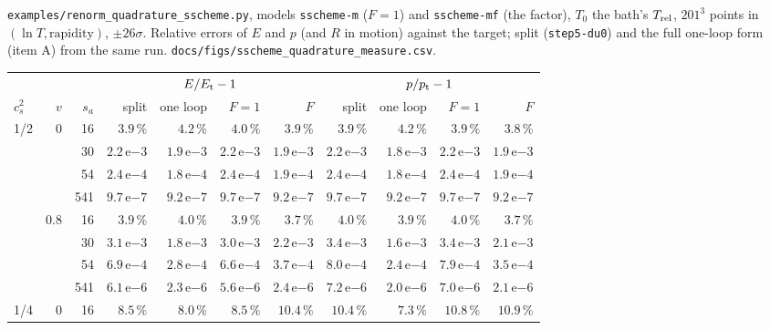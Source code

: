 \documentclass[11pt,aps,preprint,nofootinbib,superscriptaddress,tightenlines]{revtex4-2}
\begin{document}
\nolinkurl{examples/renorm_quadrature_sscheme.py}, models \texttt{sscheme-m} ($F=1$) and \texttt{sscheme-mf} (the factor), $T_0$ the bath's $T_{\rm rel}$,
$201^3$ points in $(\ln T,\text{rapidity})$, $\pm26\sigma$.  Relative errors of $E$ and $p$ (and $R$ in motion) against the target; split
(\texttt{step5-du0}) and the full one-loop form (item A) from the same run.  \texttt{docs/figs/sscheme\_quadrature\_measure.csv}.
\begin{center}\small
\begin{tabular}{lrr|rrrr|rrrr}
\toprule
 & & & \multicolumn{4}{c|}{$E/E_{\rm t}-1$} & \multicolumn{4}{c}{$p/p_{\rm t}-1$} \\
$c_s^2$ & $v$ & $s_a$ & split & one loop & $F=1$ & $F$ & split & one loop & $F=1$ & $F$ \\
\midrule
1/2 & 0 & 16 & $3.9\,\%$ & $4.2\,\%$ & $4.0\,\%$ & $3.9\,\%$ & $3.9\,\%$ & $4.2\,\%$ & $3.9\,\%$ & $3.8\,\%$ \\
    &   & 30 & $2.2\,\mathrm e{-3}$ & $1.9\,\mathrm e{-3}$ & $2.2\,\mathrm e{-3}$ & $1.9\,\mathrm e{-3}$ & $2.2\,\mathrm e{-3}$ & $1.8\,\mathrm e{-3}$ & $2.2\,\mathrm e{-3}$ & $1.9\,\mathrm e{-3}$ \\
    &   & 54 & $2.4\,\mathrm e{-4}$ & $1.8\,\mathrm e{-4}$ & $2.4\,\mathrm e{-4}$ & $1.9\,\mathrm e{-4}$ & $2.4\,\mathrm e{-4}$ & $1.8\,\mathrm e{-4}$ & $2.4\,\mathrm e{-4}$ & $1.9\,\mathrm e{-4}$ \\
    &   & 541 & $9.7\,\mathrm e{-7}$ & $9.2\,\mathrm e{-7}$ & $9.7\,\mathrm e{-7}$ & $9.2\,\mathrm e{-7}$ & $9.7\,\mathrm e{-7}$ & $9.2\,\mathrm e{-7}$ & $9.7\,\mathrm e{-7}$ & $9.2\,\mathrm e{-7}$ \\
    & 0.8 & 16 & $3.9\,\%$ & $4.0\,\%$ & $3.9\,\%$ & $3.7\,\%$ & $4.0\,\%$ & $3.9\,\%$ & $4.0\,\%$ & $3.7\,\%$ \\
    &   & 30 & $3.1\,\mathrm e{-3}$ & $1.8\,\mathrm e{-3}$ & $3.0\,\mathrm e{-3}$ & $2.2\,\mathrm e{-3}$ & $3.4\,\mathrm e{-3}$ & $1.6\,\mathrm e{-3}$ & $3.4\,\mathrm e{-3}$ & $2.1\,\mathrm e{-3}$ \\
    &   & 54 & $6.9\,\mathrm e{-4}$ & $2.8\,\mathrm e{-4}$ & $6.6\,\mathrm e{-4}$ & $3.7\,\mathrm e{-4}$ & $8.0\,\mathrm e{-4}$ & $2.4\,\mathrm e{-4}$ & $7.9\,\mathrm e{-4}$ & $3.5\,\mathrm e{-4}$ \\
    &   & 541 & $6.1\,\mathrm e{-6}$ & $2.3\,\mathrm e{-6}$ & $5.6\,\mathrm e{-6}$ & $2.4\,\mathrm e{-6}$ & $7.2\,\mathrm e{-6}$ & $2.0\,\mathrm e{-6}$ & $7.0\,\mathrm e{-6}$ & $2.1\,\mathrm e{-6}$ \\
\midrule
1/4 & 0 & 16 & $8.5\,\%$ & $8.0\,\%$ & $8.5\,\%$ & $10.4\,\%$ & $10.4\,\%$ & $7.3\,\%$ & $10.8\,\%$ & $10.9\,\%$ \\

\end{tabular}
\end{center}
\end{document}
